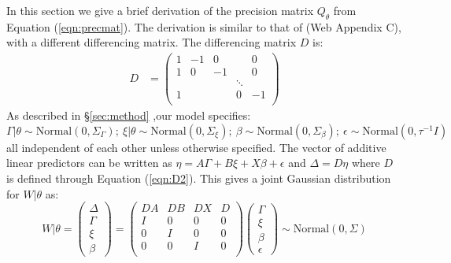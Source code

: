 \documentclass[serif,10pt]{wiley-article}
\begin{document}
In this section we give a brief derivation of the precision matrix $Q_{\theta}$ from Equation (\ref{eqn:precmat}). The derivation is similar to that of \cite{casecross} (Web Appendix C), with a different differencing matrix. The differencing matrix $D$ is:
\begin{equation}\begin{aligned}\label{eqn:D2}
D &= \begin{pmatrix}
1 & -1 & 0 & & 0 \\
1 & 0 & -1 & & 0 \\
  &    &  & \ddots  &   \\
1 &    &       & 0 & -1 \\
\end{pmatrix}
\end{aligned}\end{equation}
As described in \S\ref{sec:method} ,our model specifies:
\begin{equation*}
\Gamma|\theta \sim \text{Normal}\left( 0,\Sigma_{\Gamma}\right); \ \xi|\theta \sim \text{Normal}\left( 0,\Sigma_{\xi}\right); \ \beta \sim \text{Normal}\left( 0,\Sigma_{\beta}\right); \ \epsilon \sim \text{Normal}\left( 0,\tau^{-1}I\right)
\end{equation*}
all independent of each other unless otherwise specified. The vector of additive linear predictors can be written as $\eta = A\Gamma + B\xi + X\beta + \epsilon$ and $\Delta = D\eta$ where $D$ is defined through Equation (\ref{eqn:D2}). This gives a joint Gaussian distribution for $W|\theta$ as:
\begin{equation*}
W|\theta = \begin{pmatrix} \Delta \\ \Gamma \\ \xi \\\beta \end{pmatrix} = \begin{pmatrix} DA & DB & DX & D \\ I & 0 & 0 & 0 \\ 0 & I & 0 & 0 \\ 0 & 0 & I & 0 \\ \end{pmatrix}\begin{pmatrix}\Gamma\\ \xi \\ \beta \\ \epsilon \end{pmatrix} 
\sim \text{Normal}\left( 0,\Sigma\right)
\end{equation*}
\end{document}
